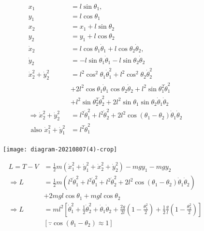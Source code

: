 \begin{enumerate}
\begin{answer}
\begin{minipage}{0.45\textwidth}
\begin{align*}
		x_{1}&=l \sin \theta_{1},\\ y_{1}&=l \cos \theta_{1}\\
		x_{2}&=x_{1}+l \sin \theta_{2}\\y_{2}&=y_{1}+l \cos \theta_{2}\\
		\dot{x}_{2}&=l \cos \theta_{1} \dot{\theta}_{1}+l \cos \theta_{2} \dot{\theta}_{2},\\ \dot{y}_{2}&=-l \sin \theta_{1} \dot{\theta}_{1}-l \sin \theta_{2} \dot{\theta}_{2}\\
		\dot{x}_{2}^{2}+\dot{y}_{2}^{2}&=l^{2} \cos ^{2} \theta_{1} \dot{\theta}_{1}^{2}+l^{2} \cos ^{2} \theta_{2} \dot{\theta}_{2}^{2}\\&+2 l^{2} \cos \theta_{1} \dot{\theta}_{1} \cos \theta_{2} \dot{\theta}_{2}+l^{2} \sin \theta_{1}^{2} \dot{\theta}_{1}^{2}
		\\&+l^{2} \sin \theta_{2}^{2} \dot{\theta}_{2}^{2}+2 l^{2} \sin \theta_{1} \sin \theta_{2} \dot{\theta}_{1} \dot{\theta}_{2}\\
		\Rightarrow \dot{x}_{2}^{2}+\dot{y}_{2}^{2}&=l^{2} \dot{\theta}_{1}^{2}+l^{2} \dot{\theta}_{2}^{2}+2 l^{2} \cos \left(\theta_{1}-\theta_{2}\right) \dot{\theta}_{1} \dot{\theta}_{2}\\\text{ also }\dot{x}_{1}^{2}+\dot{y}_{1}^{2}&=l^{2} \dot{\theta}_{1}^{2}\\
		\end{align*}
	\end{minipage}
	\begin{minipage}{0.35\textwidth}
		\begin{figure}[H]
			\centering
			\texttt{[image: diagram-20210807(4)-crop]}
		\end{figure}
	\end{minipage}
	\begin{align*}
	L=T-V&=\frac{1}{2} m\left(\dot{x}_{1}^{2}+\dot{y}_{1}^{2}+\dot{x}_{2}^{2}+\dot{y}_{2}^{2}\right)-m g y_{1}-m g y_{2}\\
	\Rightarrow L&=\frac{1}{2} m\left(l^{2} \dot{\theta}_{1}^{2}+l^{2} \dot{\theta}_{1}^{2}+l^{2} \dot{\theta}_{2}^{2}+2 l^{2} \cos \left(\theta_{1}-\theta_{2}\right) \dot{\theta}_{1} \dot{\theta}_{2}\right)\\&+2 m g l \cos \theta_{1}+m g l \cos \theta_{2}\\
	\Rightarrow L&=m l^{2}\left[\dot{\theta}_{1}^{2}+\frac{1}{2} \dot{\theta}_{2}^{2}+\dot{\theta}_{1} \dot{\theta}_{2}+\frac{2 g}{2 l}\left(1-\frac{\theta_{1}^{2}}{2}\right)+\frac{1}{2} \frac{g}{l}\left(1-\frac{\theta_{2}^{2}}{2}\right)\right]\\&\left[\because \cos \left(\theta_{1}-\theta_{2}\right) \approx 1\right]\\

\end{align*}
\end{answer}
\end{enumerate}
